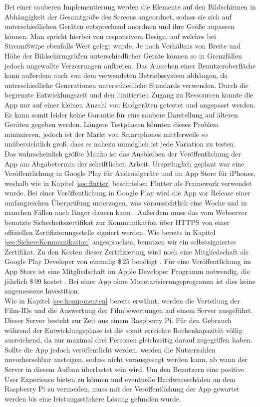 \noindent
Bei einer sauberen Implementierung werden die Elemente auf den Bildschirmen in Abhängigkeit der Gesamtgröße des Screens angeordnet, sodass sie sich auf unterschiedlichen Geräten entsprechend anordnen und ihre Größe anpassen können. Man spricht hierbei von responsivem Design, auf welches bei StreamSwipe ebenfalls Wert gelegt wurde. Je nach Verhältnis von Breite und Höhe der Bildschirmgrößen unterschiedlicher Geräte können so in Grenzfällen jedoch ungewollte Verzerrungen auftreten. Das Aussehen einer Benutzeroberfläche kann außerdem auch von dem verwendeten Betriebssystem abhängen, da unterschiedliche Generationen unterschiedliche Standards verwenden. Durch die begrenzte Entwicklungszeit  und den limitierten Zugang zu Ressourcen konnte die App nur auf einer kleinen Anzahl von  Endgeräten getestet und angepasst werden. Es kann somit leider keine Garantie für eine saubere Darstellung auf älteren Geräten gegeben werden. Längere Testphasen könnten dieses Problem minimieren, jedoch ist der Markt von Smartphones mittlerweile so unübersichtlich groß, dass es nahezu unmöglich ist jede Variation zu testen.\\
Das wahrscheinlich größte Manko ist das Ausbleiben der Veröffentlichung der App am Abgabetermin der schriftlichen Arbeit. Ursprünglich geplant war eine Veröffentlichung in Google Play für Androidgeräte und im App Store für iPhones, weshalb wie in Kapitel \ref{sec:flutter} beschrieben Flutter als Framework verwendet wurde. Bei einer Veröffentlichung in Google Play wird die App vor Release einer umfangreichen Überprüfung unterzogen, was voraussichtlich eine Woche und in manchen Fällen auch länger dauern kann \cite{playstore_release}. Außerdem muss das vom Webserver benutzte Sicherheitszertifikat zur Kommunikation über HTTPS von einer offiziellen Zertifizierungsstelle signiert werden. Wie bereits in Kapitel \ref{sec:SichereKommunikation} angesprochen, benutzen wir ein selbstsigniertes Zertifikat. Zu den Kosten dieser Zertifizierung wird noch eine Mitgliedschaft als Google Play Developer von einmalig \$\,25 benötigt \cite{kostenPlayStoreDeveloper}. Für eine  Veröffentlichung im App Store ist eine Mitgliedschaft im Apple Developer Programm notwendig, die jährlich \$\,99 kostet \cite{appstore_release}. Bei einer App ohne Monetarisierungsprogramm ist dies keine angemessene Investition. \\
Wie in Kapitel \ref{sec:komponenten} bereits erwähnt, werden die Verteilung der Film-IDs und die Auswertung der Filmbewertungen auf einem Server ausgeführt. Dieser Server besteht zur Zeit aus einem Raspberry Pi. Für den Gebrauch während der Entwicklungsphase ist die somit erreichte Rechenkapazität völlig ausreichend, da nur maximal drei Personen gleichzeitig darauf zugegriffen haben. Sollte die App jedoch veröffentlicht werden, werden die Nutzerzahlen unvorhersehbar ansteigen, sodass nicht vorausgesagt werden kann, ab wann der Server in diesem Aufbau überlastet sein wird. Um den Benutzern eine positive User Experience bieten zu können und eventuelle Hardwareschäden an dem Raspberry Pi zu vermeiden, muss mit der Veröffentlichung der App gewartet werden bis eine leistungsstärkere Lösung gefunden wurde.